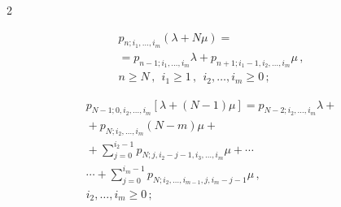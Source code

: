 \begin{multicols}{2}
\noindent


\begin{multline}


\label{bat-2}


p_{n;i_1,\ldots,i_{m}} (\lambda+N\mu) ={}\\


{}= p_{n-1;i_1,\ldots,i_{m}} \lambda


+


p_{n+1;i_1-1,i_2,\ldots,i_{m}} \mu\,,\\ 


n\ge N\,,\ \ i_1\ge 1\,,\ \ i_2,\ldots,i_{m}\ge 0\,;


\end{multline}





\vspace*{-12pt}





\noindent


\begin{multline}


\label{bat-3}


p_{N-1;0,i_2,\ldots,i_{m}} [\lambda+(N-1)\mu] =


p_{N-2;i_2,\ldots,i_{m}} \lambda+{}\\


{}+


p_{N;i_2,\ldots,i_{m}} (N-m) \mu


+{}\\


{}+


\sum\limits_{j=0}^{i_2-1} p_{N;j,i_2-j-1,i_3,\ldots,i_{m}} \mu


+ \cdots{}\\


{}\cdots + \sum\limits_{j=0}^{i_m-1} p_{N;i_2,\ldots,i_{m-1},j,i_m-j-1} \mu\,,\\ 


i_2,\ldots,i_{m} \ge 0\,;


\end{multline}





\vspace*{-12pt}





\noindent


\begin{multline}



\end{multline}
\end{multicols}
